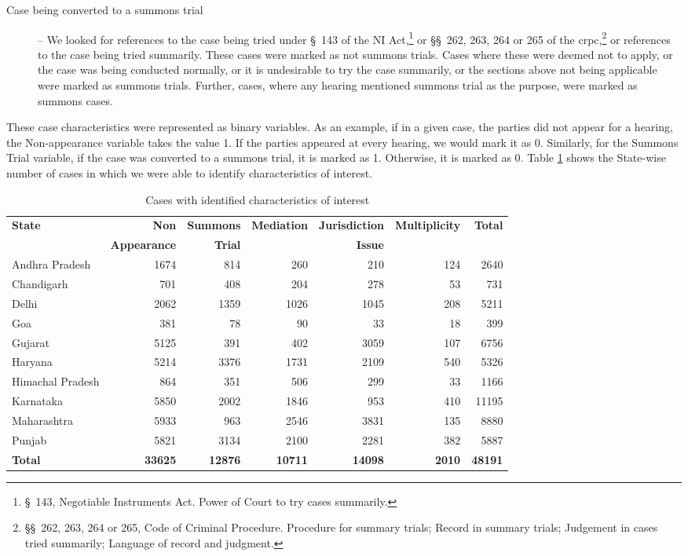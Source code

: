 \begin{description}
\item [Case being converted to a summons trial] -- We looked for references to the case being tried under \S~143 of the NI Act,\footnote{\S~143, Negotiable Instruments Act. Power of Court to try cases summarily.} or \S\S~262, 263, 264 or 265 of the \gls{crpc},\footnote{\S\S~262, 263, 264 or 265, Code of Criminal Procedure. Procedure for summary trials; Record in summary trials; Judgement in cases tried summarily; Language of record and judgment.} or references to the case being tried summarily. These cases were marked as not summons trials. Cases where these were deemed not to apply, or the case was being conducted normally, or it is undesirable to try the case summarily, or the sections above not being applicable were marked as summons trials. Further, cases, where any hearing mentioned summons trial as the purpose, were marked as summons cases.

\end{description}

These case characteristics were represented as binary variables. As an example, if in a given case, the parties did not appear for a hearing, the Non-appearance variable takes the value 1. If the parties appeared at every hearing, we would mark it as 0. Similarly, for the Summons Trial variable, if the case was converted to a summons trial, it is marked as 1. Otherwise, it is marked as 0. Table \ref{tab:case_chars} shows the State-wise number of cases in which we were able to identify characteristics of interest.

{\footnotesize
 \begin{longtable}{@{}lrrrrr|r@{}}
 \caption{Cases with identified characteristics of interest}
 \label{tab:case_chars}\\
 \toprule
 \textbf{State} & \textbf{Non} & \textbf{Summons} & \textbf{Mediation} & \textbf{Jurisdiction} & \textbf{Multiplicity} & \textbf{Total} \\
 & \textbf{Appearance} & \textbf{Trial} & & \textbf{Issue} & & \\
 \midrule
 \endhead
 Andhra Pradesh & 1674 & 814 & 260 & 210 & 124 & 2640 \\
 Chandigarh & 701 & 408 & 204 & 278 & 53 & 731 \\
 Delhi & 2062 & 1359 & 1026 & 1045 & 208 & 5211 \\
 Goa & 381 & 78 & 90 & 33 & 18 & 399 \\
 Gujarat & 5125 & 391 & 402 & 3059 & 107 & 6756 \\
 Haryana & 5214 & 3376 & 1731 & 2109 & 540 & 5326 \\
 Himachal Pradesh & 864 & 351 & 506 & 299 & 33 & 1166 \\
 Karnataka & 5850 & 2002 & 1846 & 953 & 410 & 11195 \\
 Maharashtra & 5933 & 963 & 2546 & 3831 & 135 & 8880 \\
 Punjab & 5821 & 3134 & 2100 & 2281 & 382 & 5887 \\
 \midrule
 \textbf{Total} & \textbf{33625} & \textbf{12876} & \textbf{10711} &
 \textbf{14098} & \textbf{2010} & \textbf{48191}\\\bottomrule
\end{longtable}
}

